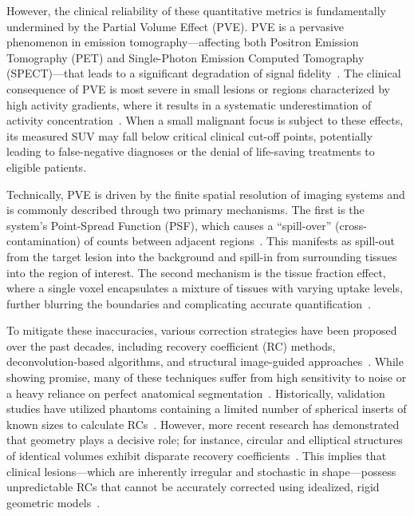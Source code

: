 However, the clinical reliability of these quantitative metrics is fundamentally undermined by the Partial Volume Effect (PVE).
PVE is a pervasive phenomenon in emission tomography---affecting both Positron Emission Tomography (PET) and Single-Photon Emission Computed Tomography (SPECT)---that leads to a significant degradation of signal fidelity~\citep{soret2007partial,erlandsson2012review,aston2002positron}.
The clinical consequence of PVE is most severe in small lesions or regions characterized by high activity gradients, where it results in a systematic underestimation of activity concentration~\citep{hoffman1979quantitation,kessler1984analysis}.
When a small malignant focus is subject to these effects, its measured SUV may fall below critical clinical cut-off points, potentially leading to false-negative diagnoses or the denial of life-saving treatments to eligible patients.

Technically, PVE is driven by the finite spatial resolution of imaging systems and is commonly described through two primary mechanisms.
The first is the system's Point-Spread Function (PSF), which causes a ``spill-over'' (cross-contamination) of counts between adjacent regions~\citep{aston2002positron,rousset1998correction,frouin2002correction}.
This manifests as spill-out from the target lesion into the background and spill-in from surrounding tissues into the region of interest.
The second mechanism is the tissue fraction effect, where a single voxel encapsulates a mixture of tissues with varying uptake levels, further blurring the boundaries and complicating accurate quantification~\citep{meltzer1990correction,mullergartner1992measurement}.

To mitigate these inaccuracies, various correction strategies have been proposed over the past decades, including recovery coefficient (RC) methods, deconvolution-based algorithms, and structural image-guided approaches~\citep{rousset1998correction,baete2004evaluation}.
While showing promise, many of these techniques suffer from high sensitivity to noise or a heavy reliance on perfect anatomical segmentation~\citep{erlandsson2012review,hoetjes2010partial}.
Historically, validation studies have utilized phantoms containing a limited number of spherical inserts of known sizes to calculate RCs~\citep{hoffman1979quantitation,geworski2000recovery}.
However, more recent research has demonstrated that geometry plays a decisive role; for instance, circular and elliptical structures of identical volumes exhibit disparate recovery coefficients~\citep{zeintl2010quantitative,gallivanone2011pve}.
This implies that clinical lesions---which are inherently irregular and stochastic in shape---possess unpredictable RCs that cannot be accurately corrected using idealized, rigid geometric models~\citep{jentzen2011phantom,seret2012quantitative}.

